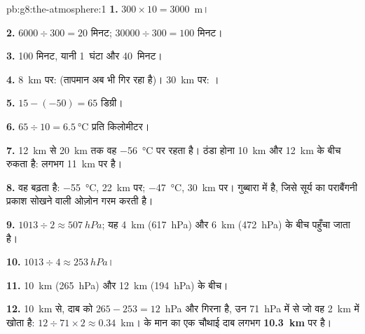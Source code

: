\begin{solution}{pb:g8:the-atmosphere:1}
\textbf{1.} $300 \times 10 = 3000$~m।

\textbf{2.} $6000 \div 300 = 20$ मिनट; $\num{30000} \div 300 = 100$
मिनट।

\textbf{3.} 100 मिनट, यानी 1~घंटा और 40~मिनट।

\textbf{4.} \qty{8}{km} पर:  (तापमान अब भी गिर रहा है)। \qty{30}{km}
पर: ।

\textbf{5.} $15 - (-50) = 65$ डिग्री।

\textbf{6.} $65 \div 10 = \qty{6.5}{\degreeCelsius}$ प्रति किलोमीटर।

\textbf{7.} \qty{12}{km} से \qty{20}{km} तक वह \qty{-56}{\degreeCelsius} पर रहता
है। ठंडा होना \qty{10}{km} और \qty{12}{km} के बीच रुकता है:  लगभग
\qty{11}{km} पर है।

\textbf{8.} वह बढ़ता है: \qty{-55}{\degreeCelsius}, \qty{22}{km} पर;
\qty{-47}{\degreeCelsius}, \qty{30}{km} पर। गुब्बारा  में है, जिसे सूर्य का
पराबैंगनी प्रकाश सोखने वाली ओज़ोन गरम करती
है।

\textbf{9.} $1013 \div 2 \approx \qty{507}{hPa}$; यह \qty{4}{km} (\qty{617}{hPa})
और \qty{6}{km} (\qty{472}{hPa}) के बीच पहुँचा जाता है।

\textbf{10.} $1013 \div 4 \approx \qty{253}{hPa}$।

\textbf{11.} \qty{10}{km} (\qty{265}{hPa}) और \qty{12}{km} (\qty{194}{hPa})
के बीच।

\textbf{12.} \qty{10}{km} से, दाब को $265 - 253 =
12$~hPa और गिरना है, उन 71~hPa
में से जो वह 2~km में खोता है: $12 \div 71 \times 2
\approx 0.34$~km। 
के मान का एक चौथाई दाब लगभग \textbf{\qty{10.3}{km}} पर
है।
\end{solution}
